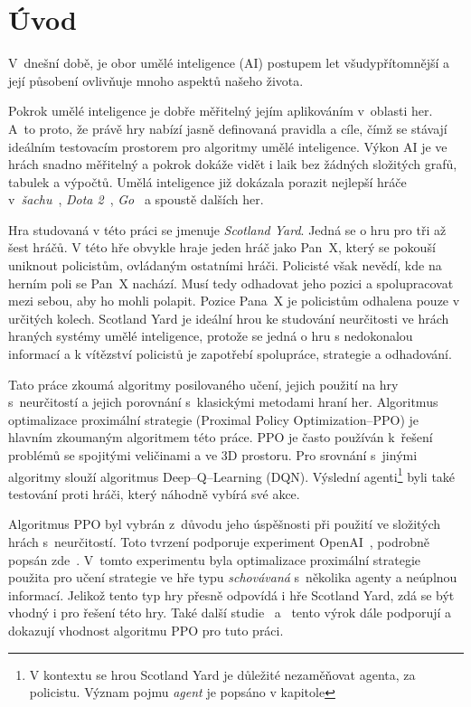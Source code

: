 \newtheorem{definition}{\textbf{Definice}}

\chapter{Úvod}
\label{ch:uvod}

V~dnešní době, je obor umělé inteligence (AI) postupem let všudypřítomnější a její působení ovlivňuje mnoho aspektů našeho života.

Pokrok umělé inteligence je dobře měřitelný jejím aplikováním v~oblasti her.
A~to proto, že právě hry nabízí jasně definovaná pravidla a cíle, čímž se stávají ideálním testovacím prostorem pro algoritmy umělé inteligence.
Výkon AI je ve hrách snadno měřitelný a pokrok dokáže vidět i laik bez žádných složitých grafů, tabulek a výpočtů.
Umělá inteligence již dokázala porazit nejlepší hráče v~\textit{šachu}~\cite{DeepBlue}, \textit{Dota 2}~\cite{Dota2}, \textit{Go}~\cite{AlphaGo} a spoustě dalších her.


Hra studovaná v této práci se jmenuje \emph{Scotland Yard}.
Jedná se o hru pro tři až šest hráčů.
V této hře obvykle hraje jeden hráč jako Pan~X, který se pokouší uniknout policistům, ovládaným ostatními hráči.
Policisté však nevědí, kde na herním poli se Pan~X nachází.
Musí tedy odhadovat jeho pozici a spolupracovat mezi sebou, aby ho mohli polapit.
Pozice Pana~X je policistům odhalena pouze v určitých kolech.
Scotland Yard je ideální hrou ke studování neurčitosti ve hrách hraných systémy umělé inteligence, protože se jedná o hru s nedokonalou informací a k vítězství policistů je zapotřebí spolupráce, strategie a odhadování.

Tato práce zkoumá algoritmy posilovaného učení, jejich použití na hry s~neurčitostí a jejich porovnání s~klasickými metodami hraní her.
Algoritmus optimalizace proximální strategie (Proximal Policy Optimization--PPO) je hlavním zkoumaným algoritmem této práce.
PPO je často používán k~řešení problémů se spojitými veličinami a ve 3D prostoru.
Pro srovnání s~jinými algoritmy slouží algoritmus Deep--Q--Learning (DQN).
Výslední agenti\footnote[1]{V kontextu se hrou Scotland Yard je důležité nezaměňovat agenta, za policistu.
Význam pojmu \emph{agent} je popsáno v kapitole } byli také testování proti hráči, který náhodně vybírá své akce.

Algoritmus PPO byl vybrán z~důvodu jeho úspěšnosti při použití ve složitých hrách s~neurčitostí.
Toto tvrzení podporuje experiment OpenAI~\cite{PPO_Hide_Seek_page}, podrobně popsán zde~\cite{PPO_Hide_Seek_paper}.
V~tomto experimentu byla optimalizace proximální strategie použita pro učení strategie ve hře typu \textit{schovávaná} s~několika agenty a neúplnou informací.
Jelikož tento typ hry přesně odpovídá i hře Scotland Yard, zdá se být vhodný i pro řešení této hry.
Také další studie~\cite{Manille} a~\cite{Dota2} tento výrok dále podporují a dokazují vhodnost algoritmu PPO pro tuto práci.

